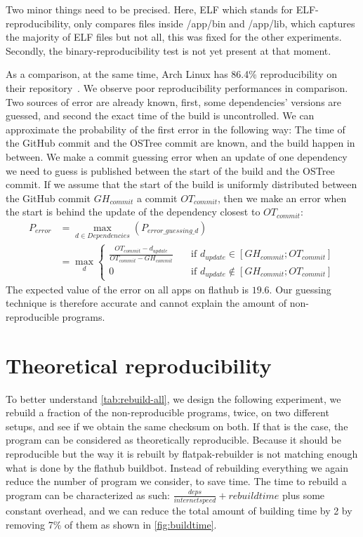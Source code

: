 \documentclass[a4paper,11pt,oneside]{report}
\theoremstyle{definition}
\newcommand{\sysname}{flatpak-rebuilder\xspace}
\newcommand{\fh}{flathub\xspace}
\newcommand{\fhbb}{flathub buildbot\xspace}
\newcommand{\ot}{OSTree\xspace}
\begin{document}
Two minor things need to be precised. Here, ELF which stands for
ELF-reproducibility, only compares files inside /app/bin and /app/lib, which
captures the majority of ELF files but not all, this was fixed for the other
experiments. Secondly, the binary-reproducibility test is not yet present at
that moment.

As a comparison, at the same time, Arch Linux has 86.4\% reproducibility on
their repository~\cite{arch-rebuilderd}. We observe poor reproducibility
performances in comparison. Two sources of error are already known, first, some
dependencies' versions are guessed, and second the exact time of the build is
uncontrolled. We can approximate the probability of the first error in the
following way: The time of the GitHub commit and the \ot commit are known, and
the build happen in between. We make a commit guessing error when an
update of one dependency we need to guess is published between the start of the
build and the \ot commit. If we assume that the start of the build is
uniformly distributed between the GitHub commit $GH_{commit}$ a
commit $OT_{commit}$, then we make an error when the start is behind the update
of the dependency closest to $OT_{commit}$:
\begin{align}
    P_{error} &= \max_{d \in Dependencies}(P_{error\_guessing\_d}) \\
              &= \max_{d}
              \begin{cases}
                \frac{OT_{commit} - d_{update}}{OT_{commit} -
                    GH_{commit}}  & \quad \text{if } d_{update}
                    \in [GH_{commit}; OT_{commit}] \\
                0  & \quad \text{if } d_{update}
                  \notin [GH_{commit}; OT_{commit}]
              \end{cases}
\end{align}
The expected value of the error on all apps on \fh is $19.6$. Our guessing
technique is therefore accurate and cannot explain the amount of
non-reproducible programs.


\section{Theoretical reproducibility}
\label{sec:theo-repro}
To better understand \autoref{tab:rebuild-all}, we design the following
experiment, we rebuild a fraction of the non-reproducible programs, twice, on
two different setups, and see if we obtain the same checksum on both. If that
is the case, the program can be considered as theoretically reproducible.
Because it should be reproducible but the way it is rebuilt by \sysname is not
matching enough what is done by the \fhbb. Instead of rebuilding everything we
again reduce the number of program we consider, to save time. The time to
rebuild a program can be characterized as such: $\frac{deps}{internet speed} +
rebuild time$ plus some constant overhead, and we can reduce the total amount
of building time by 2 by removing 7\% of them as shown in
\autoref{fig:buildtime}.
\end{document}
